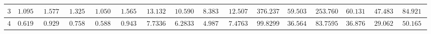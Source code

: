 \begin{table}[]
\begin{tabular}{|c|c|c|c|c|c|c|c|c|c|c|c|c|c|c|c}
$3$          & $1.095200$                                                        & $1.577800$                                                        & $1.325000$                                                          & $1.050800$                                                           & $1.565500$                                                              & $13.132400$                                                       & $10.590700$                                                         & $8.383600$                                                           & $12.507800$                                                             & $376.237700$                                                      & $59.503600$                                                         & $253.760460$                                                      & $60.131290$                                                         & $47.483650$                                                          & \multicolumn{1}{c|}{$84.921860$}                                                             \\ \hline
$4$          & $0.619100$                                                        & $0.929500$                                                        & $0.758800$                                                          & $0.588400$                                                           & $0.943400$                                                              & $7.733600$                                                        & $6.283300$                                                          & $4.987800$                                                           & $7.476300$                                                              & $99.829900$                                                       & $36.564100$                                                         & $83.759530$                                                       & $36.876860$                                                         & $29.062900$                                                          & \multicolumn{1}{c|}{$50.165330$}                                                             \\ \hline

\end{tabular}
\end{table}
